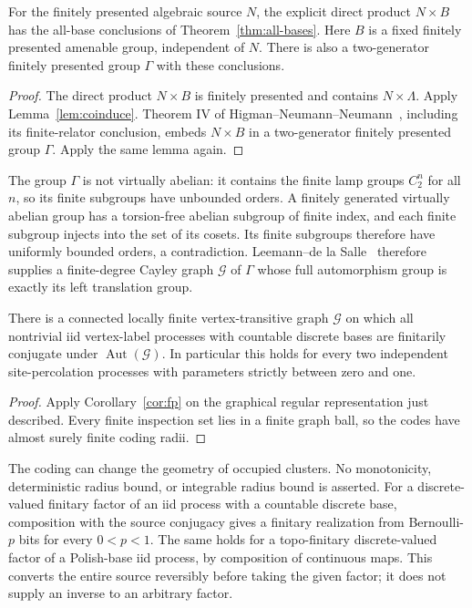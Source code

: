 \documentclass[11pt,a4paper]{article}
\numberwithin{equation}{section}
\begin{document}
\begin{corollary}\label{cor:fp}
For the finitely presented algebraic source $N$, the explicit direct
product $N\times B$ has the all-base conclusions of
Theorem~\ref{thm:all-bases}. Here $B$ is a fixed finitely presented
amenable group, independent of $N$. There is also a two-generator
finitely presented group $\Gamma$ with these conclusions.
\end{corollary}
\begin{proof}
The direct product $N\times B$ is finitely presented and contains
$N\times\Lambda$. Apply Lemma~\ref{lem:coinduce}.
Theorem IV of Higman--Neumann--Neumann~\cite{HNN}, including its
finite-relator conclusion, embeds $N\times B$ in a two-generator
finitely presented group $\Gamma$. Apply the same lemma again.
\end{proof}

The group $\Gamma$ is not virtually abelian: it contains the finite
lamp groups $C_2^n$ for all $n$, so its finite subgroups have unbounded
orders. A finitely generated virtually abelian group has a
torsion-free abelian subgroup of finite index, and each finite
subgroup injects into the set of its cosets. Its finite subgroups
therefore have uniformly bounded orders, a contradiction.
Leemann--de la Salle~\cite[Theorem 1.1]{LdS} therefore supplies a
finite-degree Cayley graph $\mathcal G$ of $\Gamma$ whose full
automorphism group is exactly its left translation group.

\begin{corollary}\label{cor:graph}
There is a connected locally finite vertex-transitive graph
$\mathcal G$ on which all nontrivial iid vertex-label processes
with countable discrete bases are finitarily conjugate under
$\operatorname{Aut}(\mathcal G)$. In particular this holds for
every two independent site-percolation processes with parameters
strictly between zero and one.
\end{corollary}
\begin{proof}
Apply Corollary~\ref{cor:fp} on the graphical regular representation
just described. Every finite inspection set lies in a finite
graph ball, so the codes have almost surely finite coding radii.
\end{proof}

The coding can change the geometry of occupied clusters. No
monotonicity, deterministic radius bound, or integrable radius
bound is asserted. For a discrete-valued finitary factor of an iid
process with a countable discrete base, composition with the source
conjugacy gives a finitary realization from Bernoulli-$p$ bits for
every $0<p<1$. The same holds for a topo-finitary discrete-valued
factor of a Polish-base iid process, by composition of continuous maps.
This converts the entire source reversibly before taking the
given factor; it does not supply an inverse to an arbitrary factor.
\end{document}
